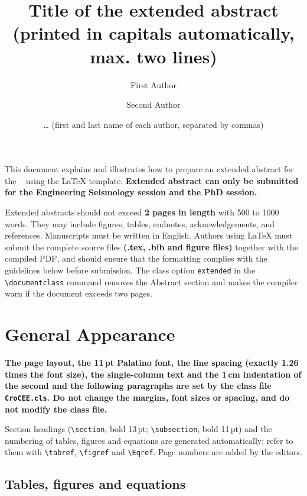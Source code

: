 \documentclass[extended]{Definitions/CroCEE}
\title{Title of the extended abstract (printed in capitals automatically, max. two lines)}
\author[1]{First Author}
\author[2]{Second Author}
\author{… (first and last name of each author, separated by commas)}
\affiliation[1]{Position, affiliation, e-mail address}
\affiliation[2]{Position, affiliation, e-mail address}
\begin{document}
\maketitle


This document explains and illustrates how to prepare an extended abstract for the \ConfFullName{} -- \ConfShort{} \ConfYear{} using the LaTeX template. \textbf{Extended abstract can only be submitted for the Engineering Seismology session and the PhD session.}

Extended abstracts should not exceed \textbf{2 pages in length} with 500 to 1000 words. They may include figures, tables, endnotes, acknowledgements, and references. Manuscripts must be written in English. Authors using LaTeX must submit the complete source files \textbf{(.tex, .bib and figure files)} together with the compiled PDF, and should ensure that the formatting complies with the guidelines below before submission. The class option \texttt{extended} in the \texttt{\textbackslash documentclass} command removes the Abstract section and makes the compiler warn if the document exceeds two pages.

\section{General Appearance}

\textbf{The page layout, the 11\,pt Palatino font, the line spacing (exactly 1.26 times the font size), the single-column text and the 1\,cm indentation of the second and the following paragraphs are set by the class file \texttt{CroCEE.cls}. Do not change the margins, font sizes or spacing, and do not modify the class file.}

Section headings (\texttt{\textbackslash section}, bold 13\,pt; \texttt{\textbackslash subsection}, bold 11\,pt) and the numbering of tables, figures and equations are generated automatically; refer to them with \texttt{\textbackslash tabref}, \texttt{\textbackslash figref} and \texttt{\textbackslash Eqref}. Page numbers are added by the editors.

\subsection{Tables, figures and equations}
\end{document}
